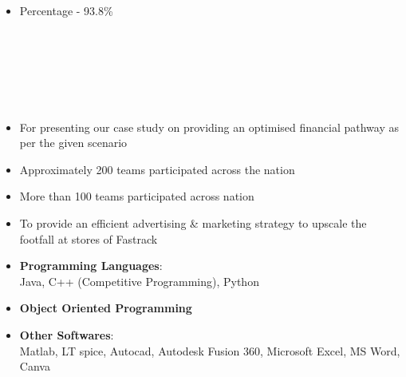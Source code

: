 \documentclass[10pt,a4paper,ragged2e,withhyper]{altacv}
\begin{document}
\begin{itemize}
\item Percentage - 93.8\%
\end{itemize}



\begin{paracol}{2}


\\
\\
\\
\\
\\



\begin{itemize}
\item For presenting our case study on providing an optimised financial pathway as per the given scenario \\ \item Approximately 200 teams participated across the nation
\end{itemize}

\begin{itemize}
\item More than 100 teams participated across nation \\ \item To provide an efficient advertising \& marketing strategy to upscale the footfall at stores of Fastrack
\end{itemize}



\begin{itemize}
    \item \textbf{Programming Languages}: \\Java, C++ (Competitive Programming), Python
    \item \textbf{Object Oriented Programming}
    \item \textbf{Other Softwares}:\\ Matlab, LT spice, Autocad, Autodesk Fusion 360, Microsoft Excel, MS Word, Canva
\end{itemize}



\end{paracol}
\end{document}

